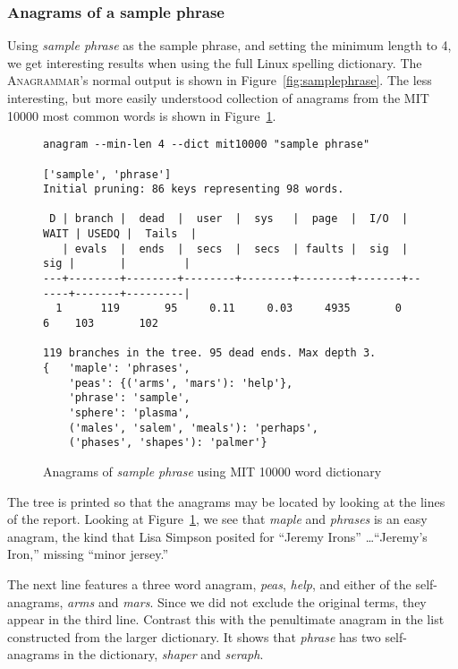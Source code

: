 \documentclass[letterpaper, 11pt]{article}
\providecommand{\anagrammar}{A\textsc{nagrammar}\xspace}
\begin{document}
\subsubsection{Anagrams of a sample phrase}

Using \emph{sample phrase} as the sample phrase, and setting the minimum
length to 4, we get interesting results when using the full Linux 
spelling dictionary. The \anagrammar's normal output is shown in Figure~\ref{fig:samplephrase}.
The less interesting, but more easily understood collection of anagrams from the MIT 10000 most
common words is shown in Figure~\ref{fig:smallsample}.


\begin{figure}
\footnotesize
\begin{verbatim}
anagram --min-len 4 --dict mit10000 "sample phrase"

['sample', 'phrase']
Initial pruning: 86 keys representing 98 words.

 D | branch |  dead  |  user  |  sys   |  page  |  I/O  | WAIT | USEDQ |  Tails  |
   | evals  |  ends  |  secs  |  secs  | faults |  sig  |  sig |       |         |
---+--------+--------+--------+--------+--------+-------+------+-------+---------|
  1      119       95     0.11     0.03     4935       0      6    103       102

119 branches in the tree. 95 dead ends. Max depth 3.
{   'maple': 'phrases',
    'peas': {('arms', 'mars'): 'help'},
    'phrase': 'sample',
    'sphere': 'plasma',
    ('males', 'salem', 'meals'): 'perhaps',
    ('phases', 'shapes'): 'palmer'}

\end{verbatim}
\normalsize
\caption{Anagrams of \emph{sample phrase} using MIT 10000 word dictionary}
\label{fig:smallsample}
\end{figure}

The tree is printed so that the anagrams may be located by looking at the 
lines of the report. Looking at Figure~\ref{fig:smallsample}, we see that 
\emph{maple} and \emph{phrases} is an easy anagram, the kind that Lisa Simpson
posited for ``Jeremy Irons'' \ldots ``Jeremy's Iron,'' missing ``minor jersey.''

The next line features a three word anagram, \emph{peas}, \emph{help}, and 
either of the self-anagrams, \emph{arms} and \emph{mars}. Since we did not
exclude the original terms, they appear in the third line. Contrast this 
with the penultimate anagram in the list constructed from the larger dictionary.
It shows that \emph{phrase} has two self-anagrams in the dictionary, 
\emph{shaper} and \emph{seraph}.
\end{document}
